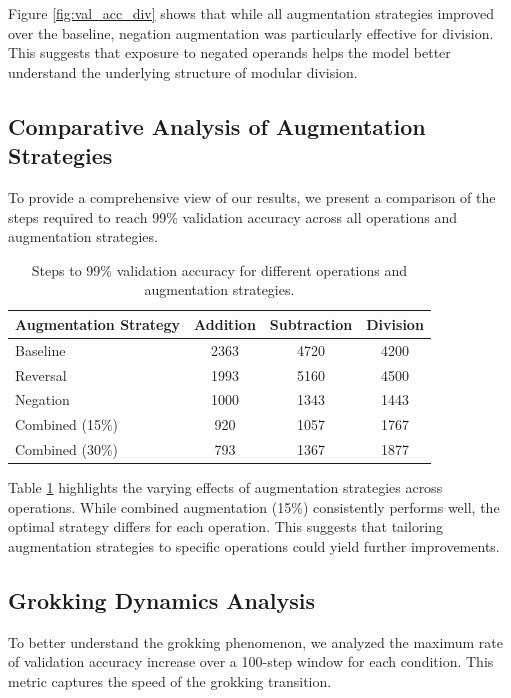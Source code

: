 \documentclass{article} %
\begin{document}
Figure \ref{fig:val_acc_div} shows that while all augmentation strategies improved over the baseline, negation augmentation was particularly effective for division. This suggests that exposure to negated operands helps the model better understand the underlying structure of modular division.

\subsection{Comparative Analysis of Augmentation Strategies}

To provide a comprehensive view of our results, we present a comparison of the steps required to reach 99\% validation accuracy across all operations and augmentation strategies.

\begin{table}[h]
\centering
\begin{tabular}{lccc}
\toprule
Augmentation Strategy & Addition & Subtraction & Division \\
\midrule
Baseline & 2363 & 4720 & 4200 \\
Reversal & 1993 & 5160 & 4500 \\
Negation & 1000 & 1343 & 1443 \\
Combined (15\%) & 920 & 1057 & 1767 \\
Combined (30\%) & 793 & 1367 & 1877 \\
\bottomrule
\end{tabular}
\caption{Steps to 99\% validation accuracy for different operations and augmentation strategies.}
\label{tab:steps_to_99}
\end{table}

Table \ref{tab:steps_to_99} highlights the varying effects of augmentation strategies across operations. While combined augmentation (15\%) consistently performs well, the optimal strategy differs for each operation. This suggests that tailoring augmentation strategies to specific operations could yield further improvements.

\subsection{Grokking Dynamics Analysis}

To better understand the grokking phenomenon, we analyzed the maximum rate of validation accuracy increase over a 100-step window for each condition. This metric captures the speed of the grokking transition.
\end{document}
